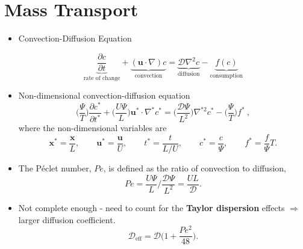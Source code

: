 \documentclass[a4paper]{article}
\begin{document}
\section{Mass Transport}
\begin{itemize}
    \item Convection-Diffusion Equation\\
    \begin{minipage}{0.5\textwidth}
    \[ \underbrace{\frac{\partial c}{\partial t}}_{\text{rate of change}} + \underbrace{(\mathbf{u} \cdot \nabla) c}_{\text{convection}} =  \underbrace{\mathcal{D} \nabla^{2} c}_{\text{diffusion}} - \underbrace{f(c)}_{\text{consumption}} \] 
    \end{minipage}
    \begin{minipage}{0.4\textwidth}
    \begin{itemize}
    \end{itemize}
    \end{minipage}

    \item Non-dimensional convection-diffusion equation
    \[
        \bigg( \frac{\Psi}{T} \bigg) \frac{\partial c^*}{\partial t^*} + \bigg( \frac{U\Psi}{L} \bigg) \mathbf{u}^* \cdot \nabla^* c^* = \bigg( \frac{\mathcal{D}\Psi}{L^2} \bigg) \nabla^{*2} c^* - \bigg( \frac{\Psi}{T} \bigg) f^* \ ,
    \]
    where the non-dimensional variables are
    \[
        \mathbf{x}^* = \frac{\mathbf{x}}{L},
        \quad \quad
        \mathbf{u}^* = \frac{\mathbf{u}}{U},
        \quad \quad
        t^* = \frac{t}{L/U},
        \quad \quad
        c^* = \frac{c}{\Psi}, 
        \quad \quad
        f^* = \frac{f}{\Psi} T.
    \]

    \item The P\'eclet number, $Pe$, is defined as the ratio of convection to diffusion,
    \[
        Pe = \frac{U\Psi}{L} \bigg/
        \frac{\mathcal{D}\Psi}{L^2} = \frac{UL}{\mathcal{D}}.
    \]

    \item Not complete enough - need to count for the \textbf{Taylor dispersion} effects $\Rightarrow$ larger diffusion coefficient.
    \[
        \mathcal{D}_{\mathrm{eff}} = \mathcal{D} \bigg(1 + \frac{Pe^2}{48} \bigg).
    \]
\end{itemize}


\end{document}
